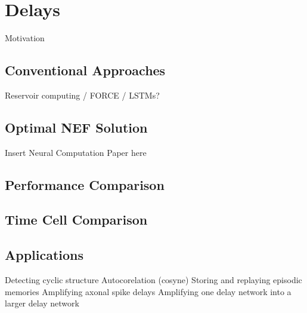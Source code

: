 \chapter{Delays}
\label{chapt:delays}

Motivation

\section{Conventional Approaches}

Reservoir computing / FORCE / LSTMs?

\section{Optimal NEF Solution}

Insert Neural Computation Paper here

\section{Performance Comparison}

\section{Time Cell Comparison}

\section{Applications}
\label{sec:delay-applications}

Detecting cyclic structure
Autocorelation (cosyne)
Storing and replaying episodic memories
Amplifying axonal spike delays
Amplifying one delay network into a larger delay network

